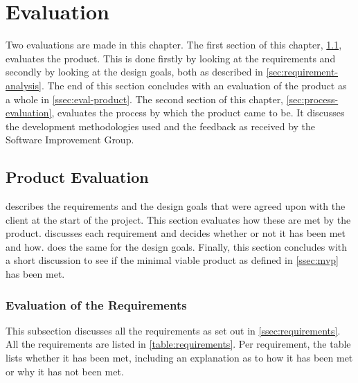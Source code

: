 \chapter{Evaluation}
\label{cha:evaluation}

Two evaluations are made in this chapter. The first section of this chapter,
\cref{sec:product-evaluation}, evaluates the product. This is done firstly by
looking at the requirements and secondly by looking at the design goals, both as
described in \cref{sec:requirement-analysis}. The end of this section concludes
with an evaluation of the product as a whole in \cref{ssec:eval-product}. The
second section of this chapter, \cref{sec:process-evaluation}, evaluates the
process by which the product came to be. It discusses the development
methodologies used and the feedback as received by the Software Improvement
Group.

\section{Product Evaluation}
\label{sec:product-evaluation}

 describes the requirements and the design goals
that were agreed upon with the client at the start of the project. This section
evaluates how these are met by the product. 
discusses each requirement and decides whether or not it has been met and how.
 does the same for the design goals.  Finally, this
section concludes with a short discussion to see if the minimal viable product
as defined in \cref{ssec:mvp} has been met.

\subsection{Evaluation of the Requirements}
\label{ssec:eval-requirements}

This subsection discusses all the requirements as set out in
\cref{ssec:requirements}. All the requirements are listed in
\cref{table:requirements}. Per requirement, the table lists whether it has been
met, including an explanation as to how it has been met or why it has not been
met.

